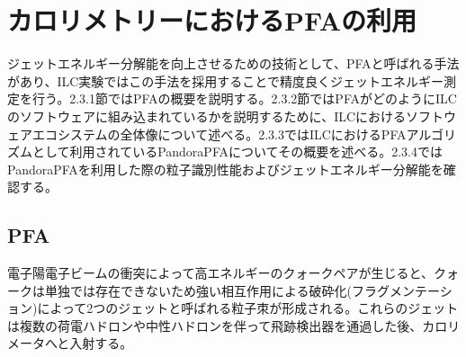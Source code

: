 

\section{カロリメトリーにおけるPFAの利用}
ジェットエネルギー分解能を向上させるための技術として、PFAと呼ばれる手法があり、ILC実験ではこの手法を採用することで精度良くジェットエネルギー測定を行う。2.3.1節ではPFAの概要を説明する。2.3.2節ではPFAがどのようにILCのソフトウェアに組み込まれているかを説明するために、ILCにおけるソフトウェアエコシステムの全体像について述べる。2.3.3ではILCにおけるPFAアルゴリズムとして利用されているPandoraPFAについてその概要を述べる。2.3.4ではPandoraPFAを利用した際の粒子識別性能およびジェットエネルギー分解能を確認する。

\subsection{PFA}
電子陽電子ビームの衝突によって高エネルギーのクォークペアが生じると、クォークは単独では存在できないため強い相互作用による破砕化(フラグメンテーション)によって2つのジェットと呼ばれる粒子朿が形成される。これらのジェットは複数の荷電ハドロンや中性ハドロンを伴って飛跡検出器を通過した後、カロリメータへと入射する。

